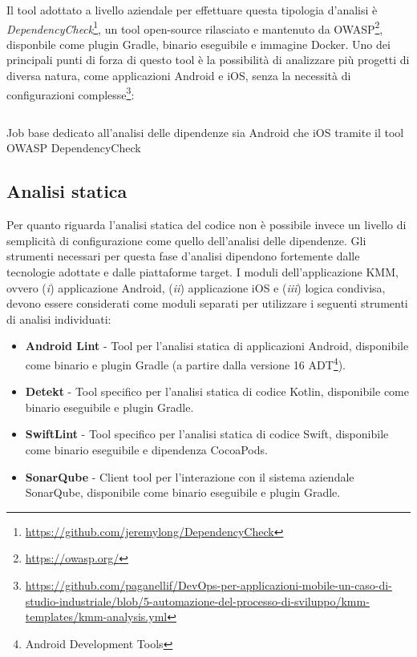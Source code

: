 Il tool adottato a livello aziendale per effettuare questa tipologia d'analisi è \textit{DependencyCheck}\footnote{\href{https://github.com/jeremylong/DependencyCheck}{https://github.com/jeremylong/DependencyCheck}}, 
un tool open-source rilasciato e mantenuto da OWASP\footnote{\href{https://owasp.org/}{https://owasp.org/}}, 
disponbile come plugin Gradle, 
binario eseguibile e immagine Docker. 
Uno dei principali punti di forza di questo tool è la possibilità di analizzare più progetti di diversa natura, 
come applicazioni Android e iOS, 
senza la necessità di configurazioni complesse\footnote{\href{https://github.com/paganellif/DevOps-per-applicazioni-mobile-un-caso-di-studio-industriale/blob/5-automazione-del-processo-di-sviluppo/kmm-templates/kmm-analysis.yml}{https://github.com/paganellif/DevOps-per-applicazioni-mobile-un-caso-di-studio-industriale/blob/5-automazione-del-processo-di-sviluppo/kmm-templates/kmm-analysis.yml}}:

\begin{listing}[H]
    \inputminted{yaml}{code/depcheck-job.yaml}
    \caption{Job base dedicato all'analisi delle dipendenze sia Android che iOS tramite il tool OWASP DependencyCheck}
\end{listing}

\subsection{Analisi statica}
Per quanto riguarda l'analisi statica del codice non è possibile invece un livello di semplicità di configurazione come quello dell'analisi delle dipendenze.
Gli strumenti necessari per questa fase d'analisi dipendono fortemente dalle tecnologie adottate e dalle piattaforme target. 
I moduli dell'applicazione KMM, 
ovvero (\textit{i}) applicazione Android, 
(\textit{ii}) applicazione iOS e (\textit{iii}) logica condivisa, 
devono essere considerati come moduli separati per utilizzare i seguenti strumenti di analisi individuati:

\begin{itemize}
    \item \textbf{Android Lint}  - Tool per l'analisi statica di applicazioni Android, disponibile come binario e plugin Gradle (a partire dalla versione 16 ADT\footnote{Android Development Tools}).
    
    \item \textbf{Detekt}  - Tool specifico per l'analisi statica di codice Kotlin, disponibile come binario eseguibile e plugin Gradle.
    
    \item \textbf{SwiftLint} - Tool specifico per l'analisi statica di codice Swift, disponibile come binario eseguibile e dipendenza CocoaPods.
    
    \item \textbf{SonarQube} - Client tool per l'interazione con il sistema aziendale SonarQube, disponibile come binario eseguibile e plugin Gradle.
\end{itemize}

